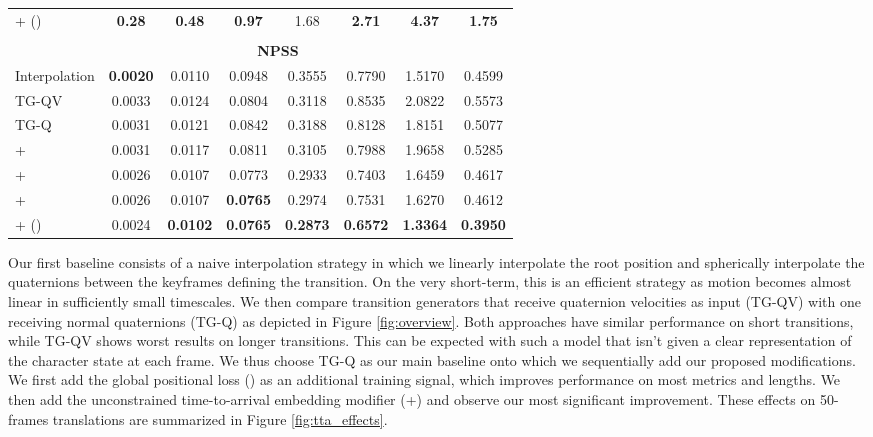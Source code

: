 \documentclass[acmtog]{acmart}
\begin{document}
\begin{table}[h]
\begin{adjustbox}{width=\columnwidth,center}
\begin{tabular}{lcccc|cc|c}
        +  ()                            & \textbf{0.28}	&\textbf{0.48} &\textbf{0.97} &1.68 &\textbf{2.71}	&\textbf{4.37} &\textbf{1.75}\\ 
        \\
        &\multicolumn{6}{c}{\textbf{NPSS}}\\
        \cmidrule(r){2-8}
        Interpolation                                   &\textbf{0.0020} &0.0110 &0.0948 &0.3555 &0.7790 &1.5170 &0.4599\\
        TG-QV                                           &0.0033	&0.0124 &0.0804 &0.3118 &0.8535	&2.0822 &0.5573\\
        \cmidrule(lr){1-8}
        TG-Q                                            &0.0031	&0.0121 &0.0842 &0.3188 &0.8128	&1.8151 &0.5077\\
        +                             &0.0031	&0.0117 &0.0811 &0.3105 &0.7988	&1.9658 &0.5285\\
        +                           &0.0026	&0.0107 &0.0773 &0.2933 &0.7403	&1.6459 &0.4617\\ +                        &0.0026	&0.0107 &\textbf{0.0765} &0.2974 &0.7531 &1.6270 &0.4612\\
        +  ()                           &0.0024	&\textbf{0.0102} &\textbf{0.0765} &\textbf{0.2873} &\textbf{0.6572}	&\textbf{1.3364} &\textbf{0.3950}\\
\end{tabular}
    \end{adjustbox}
    \label{table:transh36}
\end{table} 
Our first baseline consists of a naive interpolation strategy in which we linearly interpolate the root position and spherically interpolate the quaternions between the keyframes defining the transition. On the very short-term, this is an efficient strategy as motion becomes almost linear in sufficiently small timescales. We then compare transition generators that receive quaternion velocities as input (TG-QV) with one receiving normal quaternions (TG-Q) as depicted in Figure \ref{fig:overview}. Both approaches have similar performance on short transitions, while TG-QV shows worst results on longer transitions. This can be expected with such a model that isn't given a clear representation of the character state at each frame. We thus choose TG-Q as our main baseline onto which we sequentially add our proposed modifications. We first add the global positional loss () as an additional training signal, which improves performance on most metrics and lengths. We then add the unconstrained time-to-arrival embedding modifier (+) and observe our most significant improvement. These effects on 50-frames translations are summarized in Figure \ref{fig:tta_effects}.
\end{document}
